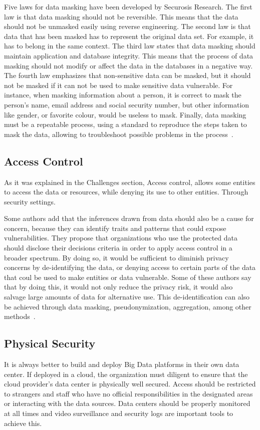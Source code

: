 Five laws for data masking have been developed by Securosis 
Research. 
The first law is that data masking should not be reversible.
This means that the data should not be unmasked easily using
reverse engineering. 
The second law is that data that has been masked has to 
represent the original data set. For example, it has to belong
in the same context.
The third law states that data masking should maintain application 
and database integrity. This means that the process of data masking
should not modify or affect the data in the databases in a negative way. 
The fourth law emphasizes that non-sensitive data can be masked,
but it should not be masked if it can not be used to make sensitive
data vulnerable. For instance, when masking information about a 
person, it is correct to mask the person’s name, email address 
and social security number, but other information like gender,
or favorite colour, would be useless to mask.
Finally, data masking must be a repeatable process, using a standard 
to reproduce the steps taken to mask the data, allowing to troubleshoot 
possible problems in the process~\cite{archana2017big}.


\subsection{Access Control}
As it was explained in the Challenges section, Access control,
allows some entities to access the data or resources, while denying
its use to other entities. Through security settings. 

Some authors add that the inferences drawn from data should also be a 
cause for concern, because they can identify traits and patterns that
could  expose vulnerabilities. They propose that organizations who
use the protected data should disclose their decisions criteria in
order to apply access control in a broader spectrum. By doing so, 
it would be sufficient to diminish privacy concerns by de-identifying
the data, or denying access to certain parts of the data that coul
be used to make entities or data vulnerable. Some of these authors 
say that by doing this, it would not only reduce the privacy risk, 
it would also salvage large amounts of data for alternative use.
This de-identification can also be achieved through data masking,
pseudonymization, aggregation, among other methods~\cite{tene2012big}.

\subsection{Physical Security}
It is always better to build and deploy Big Data platforms in their 
own data center. If deployed in a cloud, the organization must 
diligent to ensure that the cloud provider's data center is physically
well secured. Access should be restricted to strangers and staff 
who have no official responsibilities in the designated areas or
interacting with the data sources. Data centers should be properly
monitored at all times and video surveillance and security logs 
are important tools to achieve this.  

